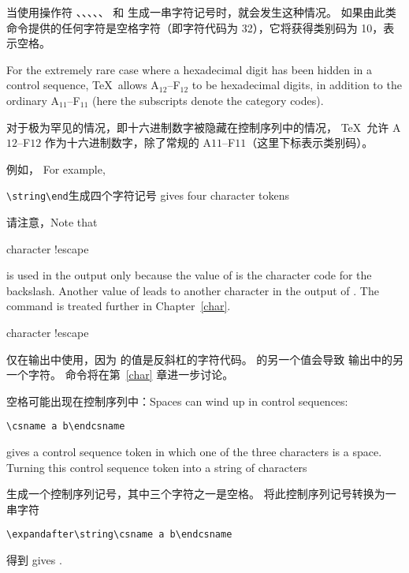 当使用操作符 、、、、、 和  生成一串字符记号时，就会发生这种情况。
如果由此类命令提供的任何字符是空格字符（即字符代码为 32），它将获得类别码为 10，表示空格。

For the extremely rare case where a hexadecimal digit has been
hidden in a control sequence, \TeX\ allows \n A$_{12}$--\n F$_{12}$
to be hexadecimal digits, in addition to the ordinary
\n A$_{11}$--\n F$_{11}$ (here
the subscripts denote the category codes).

对于极为罕见的情况，即十六进制数字被隐藏在控制序列中的情况，
\TeX\ 允许 \n A${12}$--\n F${12}$ 作为十六进制数字，除了常规的 \n A${11}$--\n F${11}$（这里下标表示类别码）。



例如， \hfill For example,
\begin{disp}\verb>\string\end>\quad 生成四个字符记号 gives four character tokens\quad
{} \end{disp}
请注意，\hfill Note that

\term character !escape\par\label{use:escape}
is used in the output only because the
value of  is the character code for the
backslash. Another value of  leads to another
character in the output of . 
The  command is treated further in Chapter~\ref{char}.

\term character !escape\par\label{use:escape}
仅在输出中使用，因为  的值是反斜杠的字符代码。
 的另一个值会导致  输出中的另一个字符。
 命令将在第~\ref{char} 章进一步讨论。

空格可能出现在控制序列中：\hfill Spaces can wind up in control sequences:
\begin{disp}\verb>\csname a b\endcsname>\end{disp} gives a control sequence
token in which one of the three characters is a space.
Turning this control sequence token into a string of characters

生成一个控制序列记号，其中三个字符之一是空格。
将此控制序列记号转换为一串字符
\begin{disp}\verb>\expandafter\string\csname a b\endcsname>\end{disp}
得到 gives 
.


